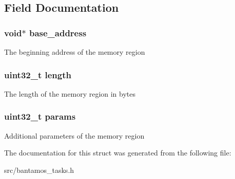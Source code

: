 \subsection{Field Documentation}
\hypertarget{struct_memory_region__t_ae4433d6e012d62e85ea5c37879c6bc91}{
\subsubsection[{base\-\_\-address}]{\setlength{\rightskip}{0pt plus 5cm}void$\ast$ base\-\_\-address}}\label{struct_memory_region__t_ae4433d6e012d62e85ea5c37879c6bc91}
The beginning address of the memory region \hypertarget{struct_memory_region__t_aebb70c2aab3407a9f05334c47131a43b}{
\subsubsection[{length}]{\setlength{\rightskip}{0pt plus 5cm}uint32\-\_\-t length}}\label{struct_memory_region__t_aebb70c2aab3407a9f05334c47131a43b}
The length of the memory region in bytes \hypertarget{struct_memory_region__t_aacc4ff38dddfc92c7929e3fc9ead2f7e}{
\subsubsection[{params}]{\setlength{\rightskip}{0pt plus 5cm}uint32\-\_\-t params}}\label{struct_memory_region__t_aacc4ff38dddfc92c7929e3fc9ead2f7e}
Additional parameters of the memory region 

The documentation for this struct was generated from the following file\-:\begin{DoxyCompactItemize}
\item 
src/bantamos\-\_\-tasks.\-h\end{DoxyCompactItemize}
